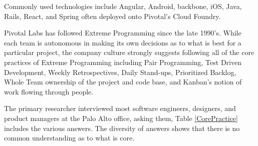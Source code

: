 Commonly used technologies include Angular, Android, backbone, iOS, Java, Rails, React, and Spring often deployed onto Pivotal's Cloud Foundry. 

Pivotal Labs has followed Extreme Programming \cite{ExtremeProgramming2004} since the late 1990's. While each team is autonomous in making its own decisions as to what is best for a particular project, the company culture strongly suggests following all of the core practices of Extreme Programming including Pair Programming, Test Driven Development, Weekly Retrospectives, Daily Stand-ups, Prioritized Backlog, Whole Team ownership of the project and code base, and Kanban's notion of work flowing through people.

The primary researcher interviewed most software engineers, designers, and product managers at the Palo Alto office, asking them,  Table \ref{CorePractice} includes the various answers. The diversity of answers shows that there is no common understanding as to what is core. 

